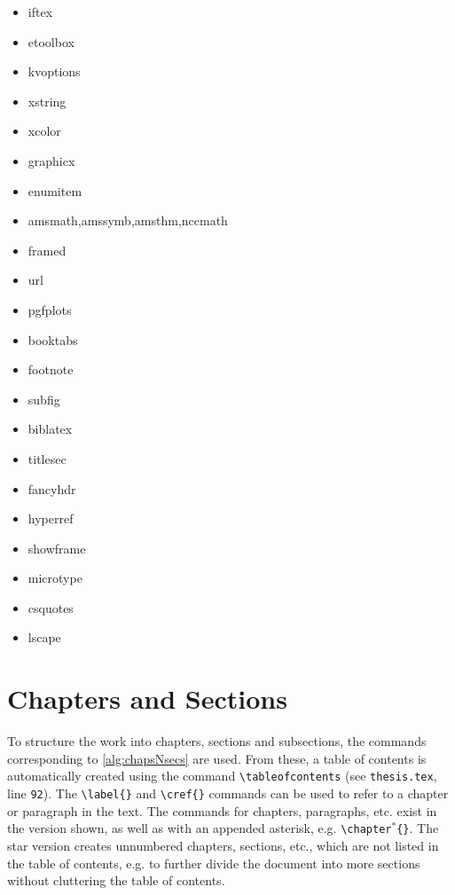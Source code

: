 \begin{minipage}{.49\textwidth}
\begin{itemize}
\item iftex
\item etoolbox
\item kvoptions
\item xstring
\item xcolor
\item graphicx
\item enumitem
\item amsmath,amssymb,amsthm,nccmath
\item framed
\item url
\item pgfplots
\end{itemize}
\end{minipage}\hfill
\begin{minipage}{.49\textwidth}
\begin{itemize}
\item booktabs
\item footnote
\item subfig
\item biblatex
\item titlesec
\item fancyhdr
\item hyperref
\item showframe
\item microtype
\item csquotes
\item lscape
\end{itemize}
\end{minipage}

\section{Chapters and Sections}
\label{sec:kapitel}

To structure the work into chapters, sections and subsections, the commands corresponding to \cref{alg:chapsNsecs} are used.
From these, a table of contents is automatically created using the command \texttt{\textbackslash{}tableofcontents} (see \texttt{thesis.tex}, line \texttt{92}).
The \texttt{\textbackslash{}label\{\}} and \texttt{\textbackslash{}cref\{\}} commands can be used to refer to a chapter or paragraph in the text.
The commands for chapters, paragraphs, etc. exist in the version shown, as well as with an appended asterisk, e.g. \texttt{\textbackslash{}chapter$^\ast$\{\}}. 
The star version creates unnumbered chapters, sections, etc., which are not listed in the table of contents, e.g. to further divide the document into more sections without cluttering the table of contents.

